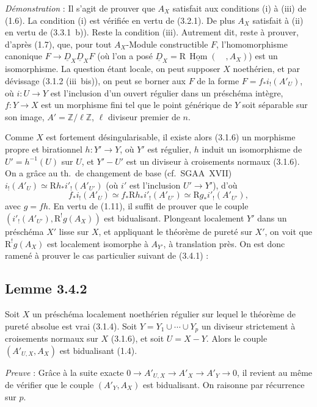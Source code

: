 \documentclass[11pt]{article}
\DeclareMathOperator{\Hom}{Hom}
\newcommand{\R}{\mathrm{R}}\newcommand{\RHomCore}{\mathrm{RHom}}
\newcommand{\Z}{\mathbb{Z}}
\providecommand{\Hom}{\operatorname{Hom}}
\providecommand{\R}{\mathrm R}
\providecommand{\Z}{\mathbb Z}
\providecommand{\Hom}{\operatorname{Hom}}
\begin{document}
\emph{Démonstration} : Il s'agit de prouver que $A_X$ satisfait aux conditions (i) à (iii) de (1.6). La condition (i) est vérifiée en vertu de (3.2.1). De plus $A_X$ satisfait à (ii) en vertu de (3.3.1~b)). Reste la condition (iii). Autrement dit, reste à prouver, d'après (1.7), que, pour tout $A_X$-Module constructible $F$, l'homomorphisme canonique $F \to \underline{D}_X \underline{D}_X F$ (où l'on a posé $\underline{D}_X = \R\,\underline{\Hom}(\quad, A_X)$) est un isomorphisme. La question étant locale, on peut supposer $X$ noethérien, et par dévissage (3.1.2 (iii~bis)), on peut se borner aux $F$ de la forme $F = f_{*}i_{!}(A'_U)$, où $i : U \to Y$ est l'inclusion d'un ouvert régulier dans un préschéma intègre, $f : Y \to X$ est un morphisme fini tel que le point générique de $Y$ soit séparable sur son image, $A' = \Z/\ell\Z$, $\ell$ diviseur premier de $n$.

Comme $X$ est fortement désingularisable, il existe alors (3.1.6) un morphisme propre et birationnel $h : Y' \to Y$, où $Y'$ est régulier, $h$ induit un isomorphisme de $U' = h^{-1}(U)$ sur $U$, et $Y' - U'$ est un diviseur à croisements normaux (3.1.6). On a grâce au th.~de changement de base (cf.~SGAA~XVII) $i_{!}(A'_U) \simeq \R h_{*} i'_{!}(A'_{U'})$ (où $i'$ est l'inclusion $U' \to Y'$), d'où
\[
f_{*} i_{!}(A'_U) \simeq f_{*} \R h_{*} i'_{!}(A'_{U'}) \simeq \R g_{*} i'_{!}(A'_{U'}),
\]
avec $g = fh$. En vertu de (1.11), il suffit de prouver que le couple 
$(i'_{!}(A'_{U'}), \R^{!}g(A_X))$ est
bidualisant. Plongeant localement $Y'$ dans un préschéma $X'$ lisse sur $X$, et appliquant le théorème de pureté sur $X'$, on voit que $\R^{!}g(A_X)$ est localement isomorphe à $A_{Y'}$, à translation près. On est donc ramené à prouver le cas particulier suivant de (3.4.1) :

\subsection*{Lemme 3.4.2}
Soit $X$ un préschéma localement noethérien régulier sur lequel le théorème de pureté absolue est vrai (3.1.4). Soit $Y = Y_1 \cup \cdots \cup Y_p$ un diviseur strictement à croisements normaux sur $X$ (3.1.6), et soit $U = X - Y$. Alors le couple $(A'_{U,X}, A_X)$ est bidualisant (1.4).

\emph{Preuve} : Grâce à la suite exacte $0 \to A'_{U,X} \to A'_X \to A'_Y \to 0$, il revient au même de vérifier que le couple $(A'_Y, A_X)$ est bidualisant. On raisonne par récurrence sur $p$.
\end{document}
